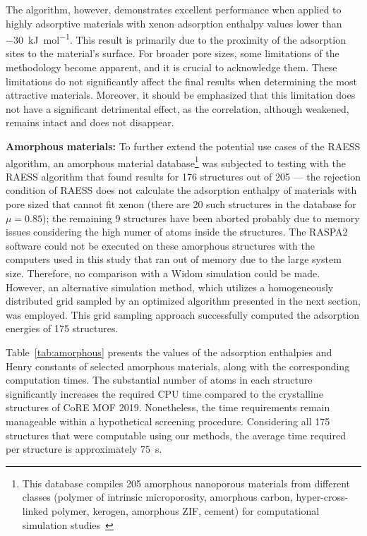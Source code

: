 \documentclass[main]{subfiles}
\begin{document}
The algorithm, however, demonstrates excellent performance when applied to highly adsorptive materials with xenon adsorption enthalpy values lower than \SI{-30}{\kilo\joule\per\mole}. This result is primarily due to the proximity of the adsorption sites to the material's surface. For broader pore sizes, some limitations of the methodology become apparent, and it is crucial to acknowledge them. These limitations do not significantly affect the final results when determining the most attractive materials. Moreover, it should be emphasized that this limitation does not have a significant detrimental effect, as the correlation, although weakened, remains intact and does not disappear.


\textbf{Amorphous materials:}
To further extend the potential use cases of the RAESS algorithm, an amorphous material database\footnote[1]{This database compiles 205 amorphous nanoporous materials from different classes (polymer of intrinsic microporosity, amorphous carbon, hyper-cross-linked polymer, kerogen, amorphous ZIF, cement) for computational simulation studies~\autocite{Thyagarajan_2020}} was subjected to testing with the RAESS algorithm that found results for 176 structures out of 205 --- the rejection condition of RAESS does not calculate the adsorption enthalpy of materials with pore sized that cannot fit xenon (there are 20 such structures in the database for $\mu=0.85$); the remaining 9 structures have been aborted probably due to memory issues considering the high numer of atoms inside the structures. The RASPA2 software could not be executed on these amorphous structures with the computers used in this study that ran out of memory due to the large system size. Therefore, no comparison with a Widom simulation could be made. However, an alternative simulation method, which utilizes a homogeneously distributed grid sampled by an optimized algorithm presented in the next section, was employed. This grid sampling approach successfully computed the adsorption energies of 175 structures.

Table~\ref{tab:amorphous} presents the values of the adsorption enthalpies and Henry constants of selected amorphous materials, along with the corresponding computation times. The substantial number of atoms in each structure significantly increases the required CPU time compared to the crystalline structures of CoRE MOF 2019. Nonetheless, the time requirements remain manageable within a hypothetical screening procedure. Considering all 175 structures that were computable using our methods, the average time required per structure is approximately \SI{75}{\second}. 
\end{document}
